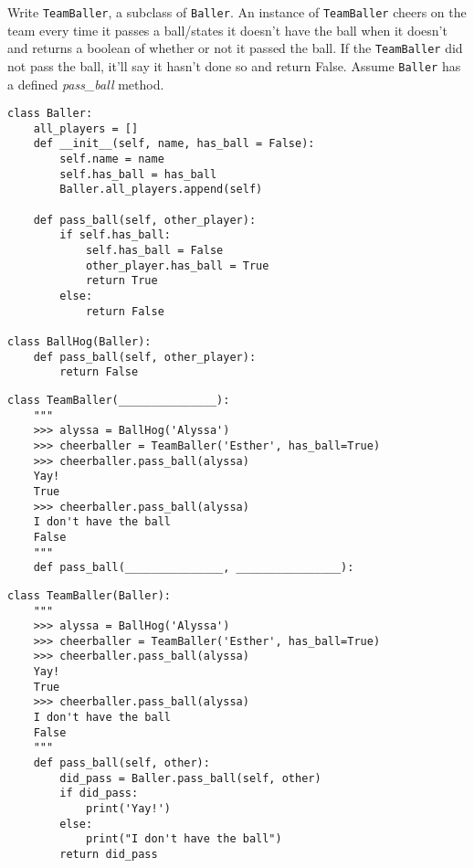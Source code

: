 \begin{blocksection}
\question Write \lstinline$TeamBaller$, a subclass of \lstinline$Baller$. An instance of \lstinline$TeamBaller$ cheers on the team every time it passes a ball/states it doesn't have the ball when it doesn't and returns a boolean of whether or not it passed the ball. If the \lstinline$TeamBaller$ did not pass the ball, it'll say it hasn't done so and return False. Assume \lstinline$Baller$ has a defined \textit{pass\_ball} method.

\begin{lstlisting}
class Baller:
    all_players = []
    def __init__(self, name, has_ball = False):
        self.name = name
        self.has_ball = has_ball
        Baller.all_players.append(self)

    def pass_ball(self, other_player):
        if self.has_ball:
            self.has_ball = False
            other_player.has_ball = True
            return True
        else:
            return False

class BallHog(Baller):
    def pass_ball(self, other_player):
        return False
\end{lstlisting}

\ifprintanswers\else
\begin{lstlisting}
class TeamBaller(_______________):
    """
    >>> alyssa = BallHog('Alyssa')
    >>> cheerballer = TeamBaller('Esther', has_ball=True)
    >>> cheerballer.pass_ball(alyssa)
    Yay! 
    True 
    >>> cheerballer.pass_ball(alyssa)
    I don't have the ball 
    False 
    """
    def pass_ball(_______________, ________________):
\end{lstlisting}
\fi

\begin{solution}[1in]
\begin{lstlisting}
class TeamBaller(Baller):
    """
    >>> alyssa = BallHog('Alyssa')
    >>> cheerballer = TeamBaller('Esther', has_ball=True)
    >>> cheerballer.pass_ball(alyssa)
    Yay!
    True
    >>> cheerballer.pass_ball(alyssa)
    I don't have the ball
    False
    """
    def pass_ball(self, other):
        did_pass = Baller.pass_ball(self, other)
        if did_pass:
            print('Yay!')
        else:
            print("I don't have the ball")
        return did_pass
\end{lstlisting}
\end{solution}


\end{blocksection}
